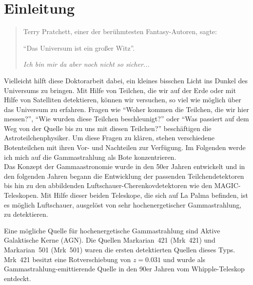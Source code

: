 \chapter{Einleitung}

\begin{quotation}
 Terry Pratchett, einer der berühmtesten Fantasy-Autoren, sagte: 
 
 \enquote{Das Universum ist ein großer Witz}.
 
 \textit{Ich bin mir da aber noch nicht so sicher...}
\end{quotation}


Vielleicht hilft diese Doktorarbeit dabei, ein kleines bisschen Licht ins Dunkel des Universums zu bringen.
Mit Hilfe von Teilchen, die wir auf der Erde oder mit Hilfe von Satelliten detektieren, können wir versuchen, so viel wie möglich über das Universum zu erfahren.
Fragen wie \enquote{Woher kommen die Teilchen, die wir hier messen?}, \enquote{Wie wurden diese Teilchen beschleunigt?} oder \enquote{Was passiert auf dem Weg von der Quelle bis zu uns mit diesen Teilchen?} beschäftigen die Astroteilchenphysiker.
Um diese Fragen zu klären, stehen verschiedene Botenteilchen mit ihren Vor- und Nachteilen zur Verfügung.
Im Folgenden werde ich mich auf die Gammastrahlung als Bote konzentrieren.\\

Das Konzept der Gammaastronomie wurde in den 50er Jahren entwickelt und in den folgenden Jahren begann die Entwicklung der passenden Teilchendetektoren bis hin zu den abbildenden Luftschauer-Cherenkovdetektoren wie den MAGIC-Teleskopen.
Mit Hilfe dieser beiden Teleskope, die sich auf La Palma befinden, ist es möglich Luftschauer, ausgelöst von sehr hochenergetischer Gammastrahlung, zu detektieren.

Eine mögliche Quelle für hochenergetische Gammastrahlung sind Aktive Galaktische Kerne (AGN).
Die Quellen Markarian~421 (Mrk~421) und Markarian~501 (Mrk~501) waren die ersten detektierten Quellen dieses Typs.
Mrk~421 besitzt eine Rotverschiebung von $z=0.031$ und wurde als Gammastrahlung-emittierende Quelle in den 90er Jahren vom Whipple-Teleskop entdeckt.

